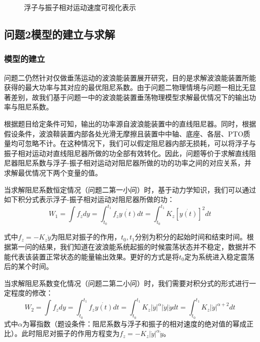 \documentclass[12pt,utf8]{article}
\begin{document}
\begin{figure}[htbp]
{\begin{minipage}[t]{0.5\textwidth}
		\end{minipage}
	}
	\caption{浮子与振子相对运动速度可视化表示}
\end{figure}



\subsection{问题2模型的建立与求解}

\subsubsection{模型的建立}

问题二仍然针对仅做垂荡运动的波浪能装置展开研究，目的是求解波浪能装置所能获得的最大功率与其对应的最优阻尼系数。由于问题二物理情境与问题一相比无显著差别，故我们基于问题一中的波浪能装置垂荡物理模型求解最优情况下的输出功率与阻尼系数。

根据题目给定条件可知，输出的功率源自波浪能装置中的直线阻尼器。同时，根据假设条件，波浪鞥装置内部各处光滑无摩擦且装置中中轴、底座、各层、PTO质量均可忽略不计。在这种情况下，我们可以假定阻尼器内部无损耗，可以将浮子与振子相对运动对直线阻尼器所做的功全部有效转化。因此，问题等价于求解直线阻尼器阻尼系数与浮子-振子相对运动对阻尼器所做的功的功率之间的对应关系，并求解最优情况下两个变量的值。

当求解阻尼系数恒定情况（问题二第一小问）时，基于动力学知识，我们可以通过如下积分式表示浮子-振子相对运动对阻尼器所做的功：
\begin{equation}
	W_1 = \int f_zdy = \int_{t_0}^{t_1} f_z\dot{y(t)}dt = \int_{t_0}^{t_1}K_z[\dot{y(t)}]^2dt
\end{equation}

式中$f_z=-K_z\dot{y}$为阻尼对振子的作用，$t_0,t_1$分别为积分的起始时间和结束时间。根据第一问的结果，我们知道在波浪能系统起振的时候震荡状态并不稳定，数据并不能代表该装置正常状态的能量输出效果。更好的方式是将$t_0$定为系统进入稳定震荡后的某个时间。

当求解阻尼系数变化情况（问题二第二小问）时，我们需要对积分式的形式进行一定程度的修改：
\begin{equation}
	W_2 = \int f_zdy = \int_{t_0}^{t_1} f_z\dot{y(t)}dt = \int_{t_0}^{t_1}K_z|\dot{y}|^{\alpha} |\dot{y}|\dot{y}dt = \int_{t_0}^{t_1}K_z|\dot{y}|^{\alpha +2} dt
\end{equation}
式中$\alpha$为幂指数（题设条件：阻尼系数与浮子和振子的相对速度的绝对值的幂成正比）。此时阻尼对振子的作用方程变为$f_z=-K_z|\dot{y}|^{\alpha}\dot{y}$。
\end{document}
